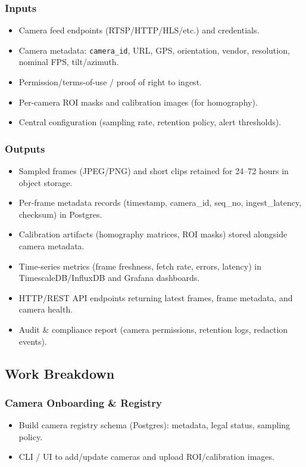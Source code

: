 \subsubsection{Inputs}
\begin{itemize}
  \item Camera feed endpoints (RTSP/HTTP/HLS/etc.) and credentials.
  \item Camera metadata: \texttt{camera\_id}, URL, GPS, orientation, vendor, resolution, nominal FPS, tilt/azimuth.
  \item Permission/terms-of-use / proof of right to ingest.
  \item Per-camera ROI masks and calibration images (for homography).
  \item Central configuration (sampling rate, retention policy, alert thresholds).
\end{itemize}

\subsubsection{Outputs}
\begin{itemize}
  \item Sampled frames (JPEG/PNG) and short clips retained for 24--72 hours in object storage.
  \item Per-frame metadata records (timestamp, camera\_id, seq\_no, ingest\_latency, checksum) in Postgres.
  \item Calibration artifacts (homography matrices, ROI masks) stored alongside camera metadata.
  \item Time-series metrics (frame freshness, fetch rate, errors, latency) in TimescaleDB/InfluxDB and Grafana dashboards.
  \item HTTP/REST API endpoints returning latest frames, frame metadata, and camera health.
  \item Audit \& compliance report (camera permissions, retention logs, redaction events).
\end{itemize}

\subsection{Work Breakdown}
\subsubsection{Camera Onboarding \& Registry}
\begin{itemize}
  \item Build camera registry schema (Postgres): metadata, legal status, sampling policy.
  \item CLI / UI to add/update cameras and upload ROI/calibration images.
\end{itemize}


